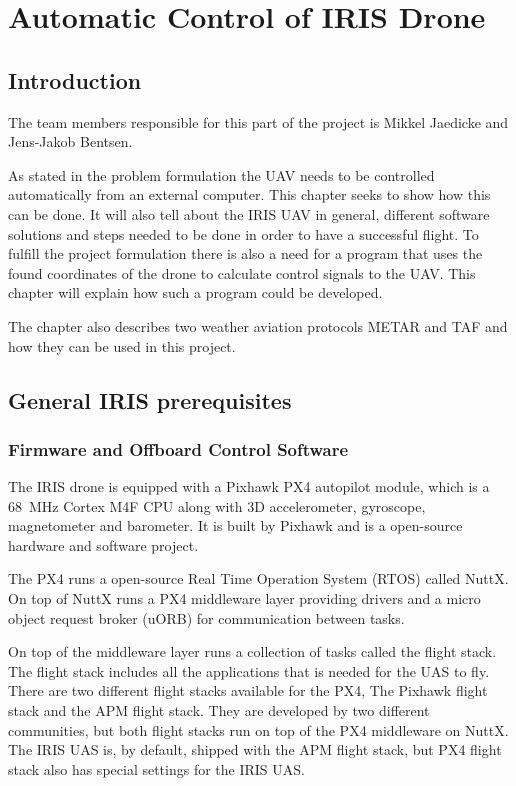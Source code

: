 \section{Automatic Control of IRIS Drone}
\subsection{Introduction}
The team members responsible for this part of the project is Mikkel Jaedicke and Jens-Jakob Bentsen.

As stated in the problem formulation the UAV needs to be controlled automatically from an external computer. This chapter seeks to show how this can be done. It will also tell about the IRIS UAV in general, different software solutions and steps needed to be done in order to have a successful flight. 
To fulfill the project formulation there is also a need for a program that uses the found coordinates of the drone to calculate control signals to the UAV. This chapter will explain how such a program could be developed. 

The chapter also describes two weather aviation protocols METAR and TAF and how they can be used in this project.

\subsection{General IRIS prerequisites}
\subsubsection{Firmware and Offboard Control Software}
The IRIS drone is equipped with a Pixhawk PX4 autopilot module, which is a \SI{68}{\mega\hertz} Cortex M4F CPU along with 3D accelerometer, gyroscope, magnetometer and barometer. It is built by Pixhawk and is a open-source hardware and software project.

The PX4 runs a open-source Real Time Operation System (RTOS) called NuttX. On top of NuttX runs a PX4 middleware layer providing drivers and a micro object request broker (uORB) for communication between tasks.

On top of the middleware layer runs a collection of tasks called the flight stack. The flight stack includes all the applications that is needed for the UAS to fly. There are two different flight stacks available for the PX4, The Pixhawk flight stack and the APM flight stack. They are developed by two different communities, but both flight stacks run on top of the PX4 middleware on NuttX. The IRIS UAS is, by default, shipped with the APM flight stack, but PX4 flight stack also has special settings for the IRIS UAS. 

